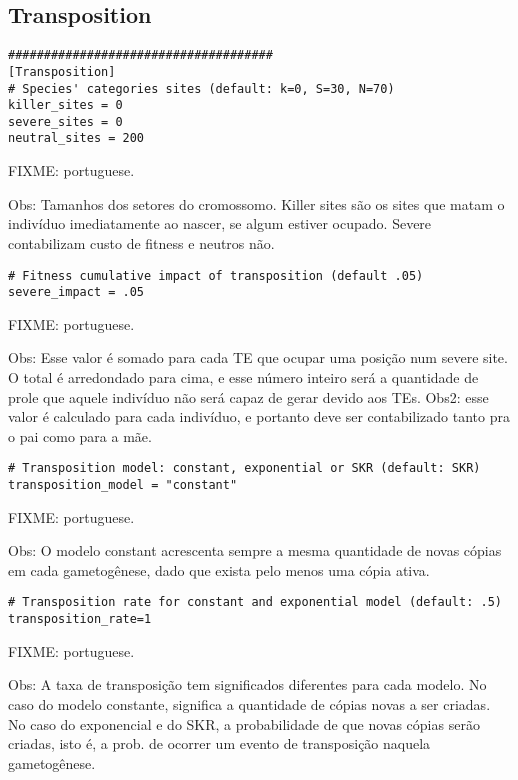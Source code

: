 \documentclass[10pt]{article}
\begin{document}
\subsection{Transposition}
\label{sec:default_config_transposition}

\begin{verbatim}
#####################################
[Transposition]
# Species' categories sites (default: k=0, S=30, N=70)
killer_sites = 0
severe_sites = 0
neutral_sites = 200
\end{verbatim}

FIXME: portuguese.

Obs: Tamanhos dos setores do cromossomo. Killer sites são os sites que
matam o indivíduo imediatamente ao nascer, se algum estiver
ocupado. Severe contabilizam custo de fitness e neutros não.

\begin{verbatim}
# Fitness cumulative impact of transposition (default .05)
severe_impact = .05
\end{verbatim}

FIXME: portuguese.

Obs: Esse valor é somado para cada TE que ocupar uma posição num
severe site. O total é arredondado para cima, e esse número inteiro
será a quantidade de prole que aquele indivíduo não será capaz de
gerar devido aos TEs. Obs2: esse valor é calculado para cada
indivíduo, e portanto deve ser contabilizado tanto pra o pai como para
a mãe.

\begin{verbatim}
# Transposition model: constant, exponential or SKR (default: SKR)
transposition_model = "constant"
\end{verbatim}

FIXME: portuguese.

Obs: O modelo constant acrescenta sempre a mesma quantidade de novas
cópias em cada gametogênese, dado que exista pelo menos uma cópia
ativa.

\begin{verbatim}
# Transposition rate for constant and exponential model (default: .5)
transposition_rate=1
\end{verbatim}

FIXME: portuguese.

Obs: A taxa de transposição tem significados diferentes para cada
modelo. No caso do modelo constante, significa a quantidade de cópias
novas a ser criadas. No caso do exponencial e do SKR, a probabilidade
de que novas cópias serão criadas, isto é, a prob. de ocorrer um
evento de transposição naquela gametogênese.
\end{document}
